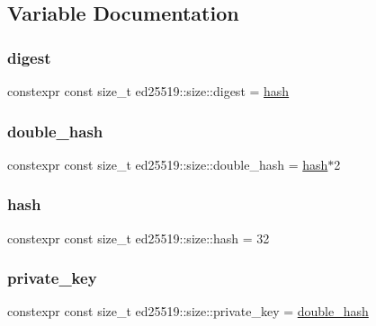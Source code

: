 \subsection{Variable Documentation}
\mbox{\label{namespaceed25519_1_1size_ab3443d829236034a3824204b295de4d0}} 
\subsubsection{\texorpdfstring{digest}{digest}}
{\footnotesize\ttfamily constexpr const size\+\_\+t ed25519\+::size\+::digest = \mbox{\hyperlink{namespaceed25519_1_1size_a0c20525cc9711076ec093177a8e36c25}{hash}}}

\mbox{\label{namespaceed25519_1_1size_ac853f864bb12792f88647a998c3c030f}} 
\subsubsection{\texorpdfstring{double\_hash}{double\_hash}}
{\footnotesize\ttfamily constexpr const size\+\_\+t ed25519\+::size\+::double\+\_\+hash = \mbox{\hyperlink{namespaceed25519_1_1size_a0c20525cc9711076ec093177a8e36c25}{hash}}$\ast$2}

\mbox{\label{namespaceed25519_1_1size_a0c20525cc9711076ec093177a8e36c25}} 
\subsubsection{\texorpdfstring{hash}{hash}}
{\footnotesize\ttfamily constexpr const size\+\_\+t ed25519\+::size\+::hash = 32}

\mbox{\label{namespaceed25519_1_1size_a2e21f8a4af0331d49145f1893a441eed}} 
\subsubsection{\texorpdfstring{private\_key}{private\_key}}
{\footnotesize\ttfamily constexpr const size\+\_\+t ed25519\+::size\+::private\+\_\+key = \mbox{\hyperlink{namespaceed25519_1_1size_ac853f864bb12792f88647a998c3c030f}{double\+\_\+hash}}}

